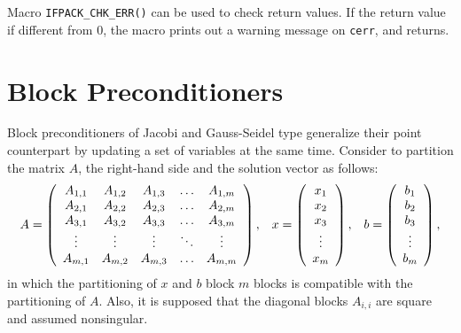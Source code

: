 Macro \verb!IFPACK_CHK_ERR()! can be used to check return values. If the
return value if different from 0, the macro prints out a warning message on
\verb!cerr!, and returns.

\section{Block Preconditioners}
\label{sec:block}

Block preconditioners of Jacobi and Gauss-Seidel type generalize their point
counterpart by updating a set of variables at the same time. Consider
to partition the matrix $A$, the right-hand side and the solution vector
as follows:
\begin{equation}
\label{eq:partition}
A = 
\left(
\begin{array}{c c c c c}
A_{1,1} & A_{1,2} & A_{1,3} & \ldots & A_{1,m} \\
A_{2,1} & A_{2,2} & A_{2,3} & \ldots & A_{2,m} \\
A_{3,1} & A_{3,2} & A_{3,3} & \ldots & A_{3,m} \\
\vdots  & \vdots  & \vdots  & \ddots & \vdots  \\
A_{m,1} & A_{m,2} & A_{m,3} & \ldots & A_{m,m} \\
\end{array}
\right),
  \;\;\;
x = 
\left(
\begin{array}{c c c c c}
x_{1} \\
x_{2} \\
x_{3} \\
\vdots  \\
x_{m}
\end{array}
\right), \;\;\;
b = 
\left(
\begin{array}{c c c c c}
b_{1} \\
b_{2} \\
b_{3} \\
\vdots  \\
b_{m}
\end{array}
\right),
\end{equation}
in which the partitioning of $x$ and $b$ block $m$ blocks is compatible with the partitioning
of $A$. Also, it is supposed that the diagonal blocks $A_{i,i}$ are square
and assumed nonsingular.

